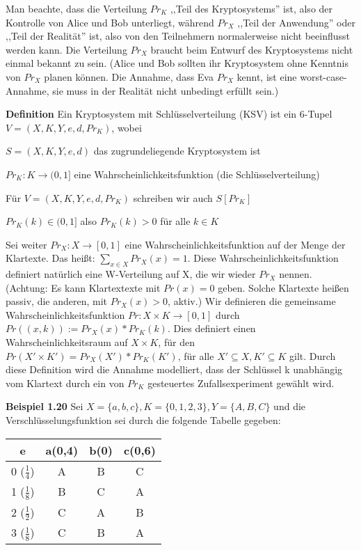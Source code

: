 \documentclass[a4paper]{article}
\begin{document}
\begin{multicols}{3}
    Man beachte, dass die Verteilung $Pr_K$ ,,Teil des Kryptosystems'' ist, also der Kontrolle von Alice und Bob unterliegt, während $Pr_X$ ,,Teil der Anwendung'' oder ,,Teil der Realität'' ist, also von den Teilnehmern normalerweise nicht beeinflusst werden kann. Die Verteilung $Pr_X$ braucht beim Entwurf des Kryptosystems nicht einmal bekannt zu sein. (Alice und Bob sollten ihr Kryptosystem ohne Kenntnis von $Pr_X$ planen können. Die Annahme, dass Eva $Pr_X$ kennt, ist eine worst-case-Annahme, sie muss in der Realität nicht unbedingt erfüllt sein.)

    \textbf{Definition} Ein Kryptosystem mit Schlüsselverteilung (KSV) ist ein 6-Tupel $V=(X,K,Y,e,d,Pr_K)$, wobei
    \begin{itemize*}
        \item $S=(X,K,Y,e,d)$ das zugrundeliegende Kryptosystem ist
        \item $Pr_K:K\rightarrow (0,1]$ eine Wahrscheinlichkeitsfunktion (die Schlüsselverteilung)
        \item Für $V=(X,K,Y,e,d,Pr_K)$ schreiben wir auch $S[Pr_K]$
        \item $Pr_K(k)\in (0,1]$ also $Pr_K(k)> 0$ für alle $k\in K$
    \end{itemize*}

    Sei weiter $Pr_X:X\rightarrow [0,1]$ eine Wahrscheinlichkeitsfunktion auf der Menge der Klartexte. Das heißt: $\sum_{x\in X}Pr_X(x)=1$. Diese Wahrscheinlichkeitsfunktion definiert natürlich eine W-Verteilung auf X, die wir wieder $Pr_X$ nennen. (Achtung: Es kann Klartextexte mit $Pr(x)=0$ geben. Solche Klartexte heißen passiv, die anderen, mit $Pr_X(x)>0$, aktiv.) Wir definieren die gemeinsame Wahrscheinlichkeitsfunktion $Pr:X\times K\rightarrow [0,1]$ durch $Pr((x,k)):=Pr_X(x)*Pr_K(k)$.
    Dies definiert einen Wahrscheinlichkeitsraum auf $X\times K$, für den $Pr(X'\times K')=Pr_X(X')*Pr_K(K')$, für alle $X'\subseteq X,K'\subseteq K$ gilt. Durch diese Definition wird die Annahme modelliert, dass der Schlüssel k unabhängig vom Klartext durch ein von $Pr_K$ gesteuertes Zufallsexperiment gewählt wird.

    \textbf{Beispiel 1.20} Sei $X=\{a,b,c\},K=\{0,1,2,3\},Y=\{A,B,C\}$ und die Verschlüsselungsfunktion sei durch die folgende Tabelle gegeben:
    \begin{tabular}{c|c|c|c}
    e         & a(0,4) & b(0) & c(0,6) \\\hline
    0 ($\frac{1}{4}$) & A   & B  & C   \\
    1 ($\frac{1}{8}$) & B   & C  & A    \\
    2 ($\frac{1}{2}$) & C   & A  & B   \\
    3 ($\frac{1}{8}$) & C  & B  & A   
    \end{tabular}


\end{multicols}
\end{document}

